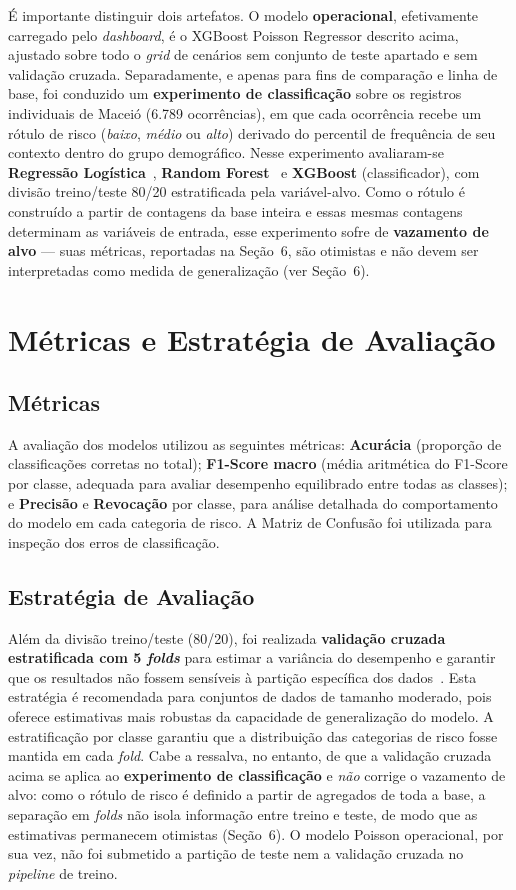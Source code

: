 \documentclass[12pt]{article}
\begin{document}
É importante distinguir dois artefatos. O modelo \textbf{operacional},
efetivamente carregado pelo \textit{dashboard}, é o XGBoost Poisson Regressor
descrito acima, ajustado sobre todo o \textit{grid} de cenários sem conjunto de
teste apartado e sem validação cruzada. Separadamente, e apenas para fins de
comparação e linha de base, foi conduzido um \textbf{experimento de
classificação} sobre os registros individuais de Maceió (6.789 ocorrências),
em que cada ocorrência recebe um rótulo de risco (\textit{baixo}, \textit{médio}
ou \textit{alto}) derivado do percentil de frequência de seu contexto dentro do
grupo demográfico. Nesse experimento avaliaram-se \textbf{Regressão
Logística}~\cite{hastie:2009}, \textbf{Random Forest}~\cite{breiman:2001} e
\textbf{XGBoost} (classificador), com divisão treino/teste 80/20 estratificada
pela variável-alvo. Como o rótulo é construído a partir de contagens da base
inteira e essas mesmas contagens determinam as variáveis de entrada, esse
experimento sofre de \textbf{vazamento de alvo} --- suas métricas, reportadas na
Seção~6, são otimistas e não devem ser interpretadas como medida de
generalização (ver Seção~6).

\section{Métricas e Estratégia de Avaliação}
\subsection{Métricas}
A avaliação dos modelos utilizou as seguintes métricas: \textbf{Acurácia}
(proporção de classificações corretas no total); \textbf{F1-Score macro}
(média aritmética do F1-Score por classe, adequada para avaliar desempenho
equilibrado entre todas as classes); e \textbf{Precisão} e \textbf{Revocação}
por classe, para análise detalhada do comportamento do modelo em cada
categoria de risco. A Matriz de Confusão foi utilizada para inspeção dos
erros de classificação.

\subsection{Estratégia de Avaliação}
Além da divisão treino/teste (80/20), foi realizada \textbf{validação cruzada
estratificada com 5 \textit{folds}} para estimar a variância do desempenho e
garantir que os resultados não fossem sensíveis à partição específica dos
dados~\cite{hastie:2009}. Esta estratégia é recomendada para conjuntos de
dados de tamanho moderado, pois oferece estimativas mais robustas da
capacidade de generalização do modelo. A estratificação por classe garantiu
que a distribuição das categorias de risco fosse mantida em cada
\textit{fold}. Cabe a ressalva, no entanto, de que a validação cruzada acima
se aplica ao \textbf{experimento de classificação} e \textit{não} corrige o
vazamento de alvo: como o rótulo de risco é definido a partir de agregados de
toda a base, a separação em \textit{folds} não isola informação entre treino e
teste, de modo que as estimativas permanecem otimistas (Seção~6). O modelo
Poisson operacional, por sua vez, não foi submetido a partição de teste nem a
validação cruzada no \textit{pipeline} de treino.
\end{document}
